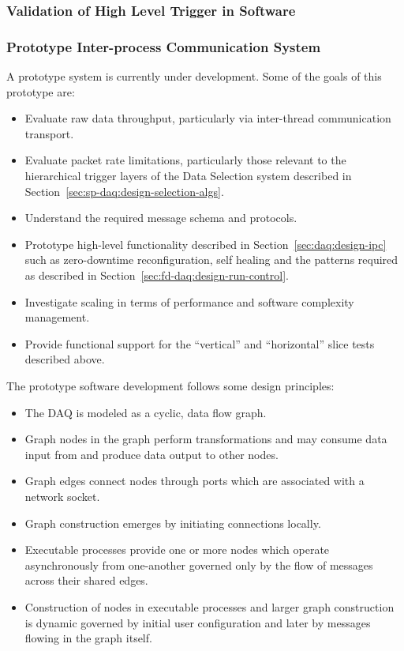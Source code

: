 \subsubsection{Validation of High Level Trigger in Software}


\subsubsection{Prototype Inter-process Communication System}
\label{sec:fd-daq:validation-demonstrators}

A prototype  system is currently under development. 
Some of the goals of this prototype are:

\begin{itemize}
\item Evaluate raw data throughput, particularly via inter-thread communication transport.
\item Evaluate packet rate limitations, particularly those relevant to the hierarchical trigger layers of the Data Selection system described in Section~\ref{sec:sp-daq:design-selection-algs}.
\item Understand the required message schema and protocols.
\item Prototype high-level functionality described in Section~\ref{sec:daq:design-ipc} such as zero-downtime reconfiguration, self healing and the patterns required  as described in Section~\ref{sec:fd-daq:design-run-control}.
\item Investigate scaling in terms of performance and software complexity management.
\item Provide functional support for the ``vertical'' and ``horizontal'' slice tests described above.
\end{itemize}

The prototype software development follows some design principles:

\begin{itemize}
\item The DAQ is modeled as a cyclic, data flow graph.
\item Graph nodes in the graph perform transformations and may consume data input from and produce data output to other nodes.
\item Graph edges connect nodes through ports which are associated with a network socket.
\item Graph construction emerges by initiating connections locally.
\item Executable processes provide one or more nodes which operate asynchronously from one-another governed only by the flow of messages across their shared edges.
\item Construction of nodes in executable processes and larger graph construction is dynamic governed by initial user configuration and later by messages flowing in the graph itself.
\end{itemize}

